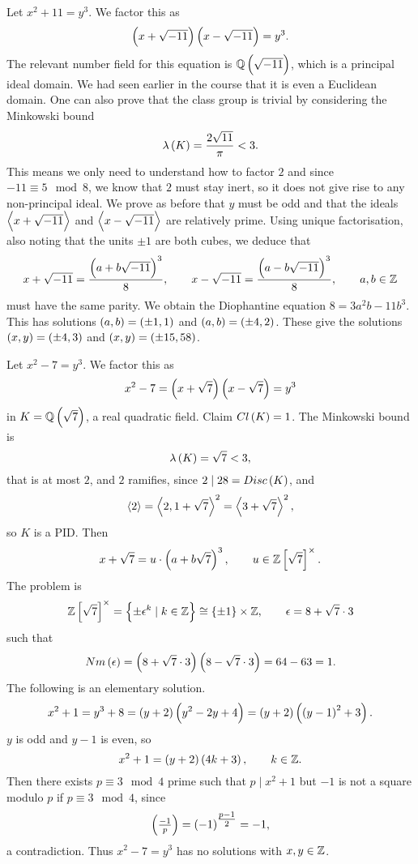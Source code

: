 \pagebreak

\begin{example*}
Let $ x^2 + 11 = y^3 $. We factor this as
$$ \br{x + \sqrt{-11}}\br{x - \sqrt{-11}} = y^3. $$
The relevant number field for this equation is $ \Q\br{\sqrt{-11}} $, which is a principal ideal domain. We had seen earlier in the course that it is even a Euclidean domain. One can also prove that the class group is trivial by considering the Minkowski bound
$$ \lambda\br{K} = \dfrac{2\sqrt{11}}{\pi} < 3. $$
This means we only need to understand how to factor $ 2 $ and since $ -11 \equiv 5 \mod 8 $, we know that $ 2 $ must stay inert, so it does not give rise to any non-principal ideal. We prove as before that $ y $ must be odd and that the ideals $ \left\langle x + \sqrt{-11} \right\rangle $ and $ \left\langle x - \sqrt{-11} \right\rangle $ are relatively prime. Using unique factorisation, also noting that the units $ \pm 1 $ are both cubes, we deduce that
$$ x + \sqrt{-11} = \dfrac{\br{a + b\sqrt{-11}}^3}{8}, \qquad x - \sqrt{-11} = \dfrac{\br{a - b\sqrt{-11}}^3}{8}, \qquad a, b \in \Z $$
must have the same parity. We obtain the Diophantine equation $ 8 = 3a^2b - 11b^3 $. This has solutions $ \br{a, b} = \br{\pm 1, 1} $ and $ \br{a, b} = \br{\pm 4, 2} $. These give the solutions $ \br{x, y} = \br{\pm 4, 3} $ and $ \br{x, y} = \br{\pm 15, 58} $.
\end{example*}

\begin{example*}
Let $ x^2 - 7 = y^3 $. We factor this as
$$ x^2 - 7 = \br{x + \sqrt{7}}\br{x - \sqrt{7}} = y^3 $$
in $ K = \Q\br{\sqrt{7}} $, a real quadratic field. Claim $ Cl\br{K} = 1 $. The Minkowski bound is
$$ \lambda\br{K} = \sqrt{7} < 3, $$
that is at most $ 2 $, and $ 2 $ ramifies, since $ 2 \mid 28 = Disc\br{K} $, and
$$ \left\langle 2 \right\rangle = \left\langle 2, 1 + \sqrt{7} \right\rangle^2 = \left\langle 3 + \sqrt{7} \right\rangle^2, $$
so $ K $ is a PID. Then
$$ x + \sqrt{7} = u \cdot \br{a + b\sqrt{7}}^3, \qquad u \in \Z\sbr{\sqrt{7}}^\times. $$
The problem is
$$ \Z\sbr{\sqrt{7}}^\times = \cbr{\pm\epsilon^k \mid k \in \Z} \cong \cbr{\pm 1} \times \Z, \qquad \epsilon = 8 + \sqrt{7} \cdot 3 $$
such that
$$ Nm\br{\epsilon} = \br{8 + \sqrt{7} \cdot 3}\br{8 - \sqrt{7} \cdot 3} = 64 - 63 = 1. $$
The following is an elementary solution.
$$ x^2 + 1 = y^3 + 8 = \br{y + 2}\br{y^2 - 2y + 4} = \br{y + 2}\br{\br{y - 1}^2 + 3}. $$
$ y $ is odd and $ y - 1 $ is even, so
$$ x^2 + 1 = \br{y + 2}\br{4k + 3}, \qquad k \in \Z. $$
Then there exists $ p \equiv 3 \mod 4 $ prime such that $ p \mid x^2 + 1 $ but $ -1 $ is not a square modulo $ p $ if $ p \equiv 3 \mod 4 $, since
$$ \jacobi{-1}{p} = \br{-1}^{\tfrac{p - 1}{2}} = -1, $$
a contradiction. Thus $ x^2 - 7 = y^3 $ has no solutions with $ x, y \in \mathbb{Z} $.
\end{example*}

